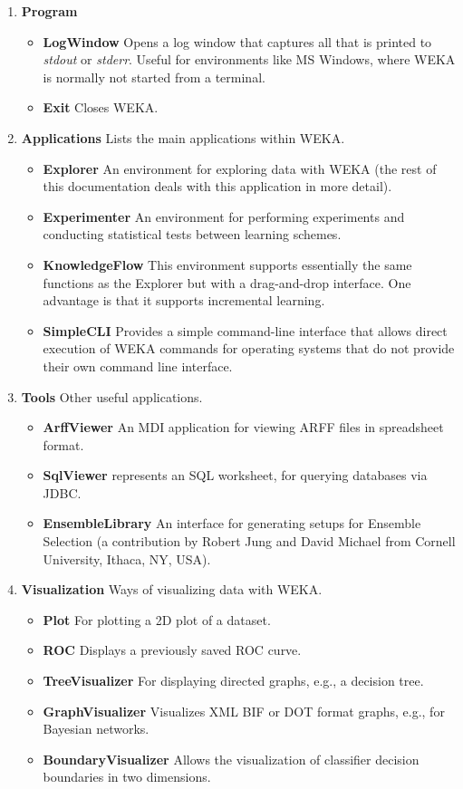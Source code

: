 \documentclass[a4paper]{article}
\begin{document}
\begin{enumerate}
	\item \textbf{Program}
		\begin{itemize}
			\item \textbf{LogWindow} Opens a log window that captures all that is printed to \textit{stdout} or \textit{stderr}. Useful for environments like MS Windows, where WEKA is normally not started from a terminal.
			\item \textbf{Exit} Closes WEKA.
		\end{itemize}
		
	\item \textbf{Applications} Lists the main applications within WEKA.
		\begin{itemize}
			\item \textbf{Explorer} An environment for exploring data with
WEKA (the rest of this documentation deals with this application in more detail).
			\item \textbf{Experimenter} An environment for performing experiments and conducting statistical tests
between learning schemes.
			\item \textbf{KnowledgeFlow} This environment supports essentially
the same functions as the Explorer but with a drag-and-drop
interface. One advantage is that it supports incremental learning.
			\item \textbf{SimpleCLI} Provides a simple command-line interface
that allows direct execution of WEKA commands for operating systems
that do not provide their own command line interface.
		\end{itemize}
		
	\item \textbf{Tools} Other useful applications.
		\begin{itemize}
			\item \textbf{ArffViewer} An MDI application for viewing ARFF files in spreadsheet format.
			\item \textbf{SqlViewer} represents an SQL worksheet, for querying databases via JDBC.
			\item \textbf{EnsembleLibrary} An interface for generating setups for Ensemble Selection \cite{ensemble} (a contribution by Robert Jung and David Michael from Cornell University, Ithaca, NY, USA).
		\end{itemize}
		
	\item \textbf{Visualization} Ways of visualizing data with WEKA.
		\begin{itemize}
			\item \textbf{Plot} For plotting a 2D plot of a dataset.
			\item \textbf{ROC} Displays a previously saved ROC curve.
			\item \textbf{TreeVisualizer} For displaying directed graphs, e.g., a decision tree.
			\item \textbf{GraphVisualizer} Visualizes XML BIF or DOT format graphs, e.g., for Bayesian networks.
			\item \textbf{BoundaryVisualizer} Allows the visualization of classifier decision boundaries in two dimensions.
		\end{itemize}
		

\end{enumerate}
\end{document}
